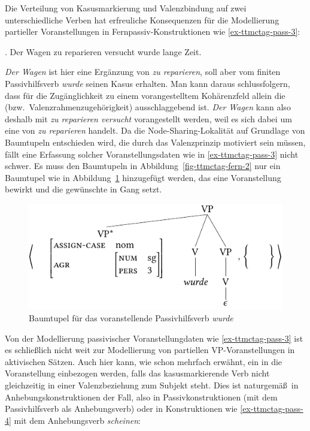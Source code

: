 Die Verteilung von Kasusmarkierung und Valenzbindung auf zwei unterschiedliche Verben hat erfreuliche Konsequenzen für die Modellierung partieller Voranstellungen in Fernpassiv-Konstruktionen wie \ref{ex-ttmctag-pass-3}:


\ex. \label{ex-ttmctag-pass-3} Der Wagen zu reparieren versucht wurde lange Zeit. \hfill \citep[(316-b)]{Meurers:99}

{\it Der Wagen} ist hier eine Ergänzung von {\it zu reparieren}, soll aber vom finiten Passivhilfsverb {\it wurde} seinen Kasus erhalten. Man kann daraus schlussfolgern, dass  für die Zugänglichkeit zu einem vorangestelltem Kohärenzfeld allein die  (bzw.\ Valenzrahmenzugehörigkeit) ausschlaggebend ist.  {\it Der Wagen} kann also deshalb mit {\it zu reparieren versucht} vorangestellt werden, weil es sich dabei um eine  von {\it zu reparieren} handelt. Da die Node-Sharing-Lokalität auf Grundlage von Baumtupeln entschieden wird, die durch das Valenzprinzip motiviert sein müssen, fällt eine Erfassung solcher Voranstellungsdaten wie in \ref{ex-ttmctag-pass-3} nicht schwer. Es muss den Baumtupeln in Abbildung~\ref{fig-ttmctag-fern-2} nur ein Baumtupel wie in Abbildung~\ref{fig-ttmctag-fern-3} hinzugefügt werden, das eine Voranstellung bewirkt und die gewünschte  in Gang setzt. \\
\begin{figure}[t]
\centering
\includegraphics{graphics/abb724.pdf}
\caption{\label{fig-ttmctag-fern-3}Baumtupel für das voranstellende Passivhilfsverb {\it wurde}}
\end{figure}

Von der Modellierung passivischer Voranstellungdaten wie \ref{ex-ttmctag-pass-3} ist es schlie\ss lich nicht weit zur Modellierung von partiellen VP-Voranstellungen in aktivischen Sätzen. Auch hier kann, wie schon mehrfach erwähnt, ein  in die Voranstellung einbezogen werden, falls das kasusmarkierende Verb nicht gleichzeitig in einer Valenzbeziehung zum Subjekt steht. Dies ist naturgemä\ss\ in Anhebungskonstruktionen der Fall, also in Passivkonstruktionen (mit dem Passivhilfsverb als Anhebungsverb) oder in Konstruktionen wie \ref{ex-ttmctag-pass-4} mit dem Anhebungsverb {\it scheinen}:  

